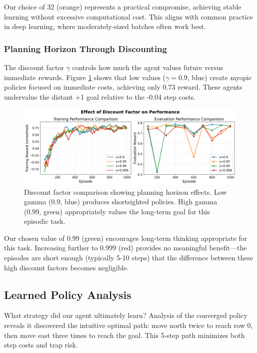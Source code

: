\documentclass[conference]{IEEEtran}
\begin{document}
Our choice of 32 (orange) represents a practical compromise, achieving stable learning without excessive computational cost. This aligns with common practice in deep learning, where moderately-sized batches often work best.

\subsubsection{Planning Horizon Through Discounting}

The discount factor $\gamma$ controls how much the agent values future versus immediate rewards. Figure \ref{fig:gamma} shows that low values ($\gamma=0.9$, blue) create myopic policies focused on immediate costs, achieving only 0.73 reward. These agents undervalue the distant +1 goal relative to the -0.04 step costs.

\begin{figure}[htbp]
\centerline{\includegraphics[width=\columnwidth]{images/experiment_gamma.png}}
\caption{Discount factor comparison showing planning horizon effects. Low gamma (0.9, blue) produces shortsighted policies. High gamma (0.99, green) appropriately values the long-term goal for this episodic task.}
\label{fig:gamma}
\end{figure}

Our chosen value of 0.99 (green) encourages long-term thinking appropriate for this task. Increasing further to 0.999 (red) provides no meaningful benefit—the episodes are short enough (typically 5-10 steps) that the difference between these high discount factors becomes negligible.

\subsection{Learned Policy Analysis}

What strategy did our agent ultimately learn? Analysis of the converged policy reveals it discovered the intuitive optimal path: move north twice to reach row 0, then move east three times to reach the goal. This 5-step path minimizes both step costs and trap risk.
\end{document}
